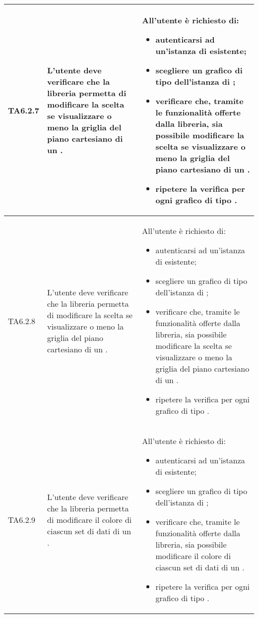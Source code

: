\begin{longtabu}{| X[0.5] | X | X |}
	TA6.2.7 & L'utente  deve verificare che la libreria permetta di modificare la scelta se visualizzare o meno la griglia del piano cartesiano di un .
		
		& All'utente  è richiesto di:
		\begin{itemize}
			\item autenticarsi ad un'istanza di \projectname{} esistente;
			\item scegliere un grafico di tipo  dell'istanza di \projectname{};
			\item verificare che, tramite le funzionalità offerte dalla libreria, sia possibile modificare la scelta se visualizzare o meno la griglia del piano cartesiano di un .
			\item ripetere la verifica per ogni grafico di tipo .
		\end{itemize}
\\ \hline

	TA6.2.8 & L'utente  deve verificare che la libreria permetta di modificare la scelta se visualizzare o meno la griglia del piano cartesiano di un .
		
		& All'utente  è richiesto di:
		\begin{itemize}
			\item autenticarsi ad un'istanza di \projectname{} esistente;
			\item scegliere un grafico di tipo  dell'istanza di \projectname{};
			\item verificare che, tramite le funzionalità offerte dalla libreria, sia possibile modificare la scelta se visualizzare o meno la griglia del piano cartesiano di un .
			\item ripetere la verifica per ogni grafico di tipo .
		\end{itemize}
\\ \hline

	TA6.2.9 & L'utente  deve verificare che la libreria permetta di modificare il colore di ciascun set di dati di un .
		
		& All'utente  è richiesto di:
		\begin{itemize}
			\item autenticarsi ad un'istanza di \projectname{} esistente;
			\item scegliere un grafico di tipo  dell'istanza di \projectname{};
			\item verificare che, tramite le funzionalità offerte dalla libreria, sia possibile modificare il colore di ciascun set di dati di un .
			\item ripetere la verifica per ogni grafico di tipo .
		\end{itemize}
\\ \hline


\end{longtabu}
